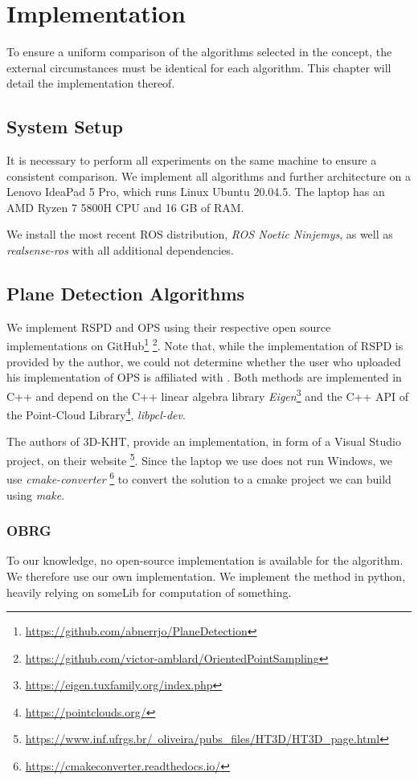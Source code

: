 \documentclass[main.tex]{subfiles}
\begin{document}
\chapter{Implementation}
To ensure a uniform comparison of the algorithms selected in the concept, the external circumstances
must be identical for each algorithm. This chapter will detail the implementation thereof.

\section{System Setup}
It is necessary to perform all experiments on the same machine to ensure a consistent comparison.
We implement all algorithms and further architecture on a Lenovo IdeaPad 5 Pro,
which runs Linux Ubuntu 20.04.5. The laptop has an AMD Ryzen 7 5800H CPU and 16 GB of RAM.

We install the most recent ROS distribution, \textit{ROS Noetic Ninjemys}, as well as \textit{realsense-ros} with all additional dependencies.


\section{Plane Detection Algorithms}
We implement RSPD and OPS using their respective open source implementations on GitHub\footnote{\href{https://github.com/abnerrjo/PlaneDetection}{{https://github.com/abnerrjo/PlaneDetection}}}
\footnote{\href{https://github.com/victor-amblard/OrientedPointSampling}{https://github.com/victor-amblard/OrientedPointSampling}}. Note that, while the implementation of RSPD is provided by the author,
we could not determine whether the user who uploaded his implementation of OPS is affiliated with \citeauthor{Sun_Mordohai_2019}.
Both methods are implemented in C++ and depend on the C++ linear algebra library \textit{Eigen}\footnote{\href{https://eigen.tuxfamily.org/index.php}{https://eigen.tuxfamily.org/index.php}}
and the C++ API of the  Point-Cloud Library\footnote{\href{https://pointclouds.org/}{https://pointclouds.org/}}, \textit{libpcl-dev}.

The authors of 3D-KHT, provide an implementation, in form of a Visual Studio project, on their website \footnote{\href{https://www.inf.ufrgs.br/~oliveira/pubs_files/HT3D/HT3D_page.html}
    {https://www.inf.ufrgs.br/~oliveira/pubs\_files/HT3D/HT3D\_page.html}}. Since the laptop we use does not run Windows, we use \textit{cmake-converter}
\footnote{\href{https://cmakeconverter.readthedocs.io/en/latest/use.html}{https://cmakeconverter.readthedocs.io/}} to convert
the solution to a cmake project we can build using \textit{make}.

\subsection*{OBRG}
To our knowledge, no open-source implementation is available for the algorithm.
We therefore use our own implementation.
We implement the method in python, heavily relying on someLib for computation of something.
\end{document}
